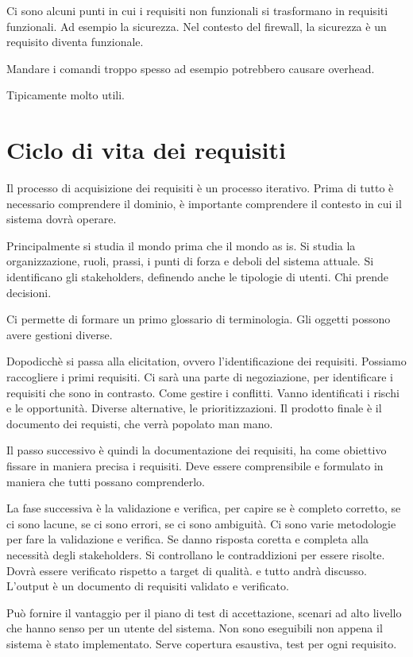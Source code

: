 \documentclass[oneside,a4paper,11pt]{book}
\theoremstyle{italicstyle}
\theoremstyle{normStyle}
\begin{document}
Ci sono alcuni punti in cui i requisiti non funzionali si 
trasformano in requisiti funzionali. Ad esempio la sicurezza.
Nel contesto del firewall, la sicurezza è un requisito diventa funzionale.

Mandare i comandi troppo spesso ad esempio potrebbero causare overhead.

Tipicamente molto utili.

\section{Ciclo di vita dei requisiti}
Il processo di acquisizione dei requisiti è un processo iterativo.
Prima di tutto è necessario comprendere il dominio, è importante 
comprendere il contesto in cui il sistema dovrà operare. 

Principalmente si studia il mondo prima che il mondo as is. Si studia la organizzazione,
ruoli, prassi, i punti di forza e deboli del sistema attuale. Si identificano 
gli stakeholders, definendo anche le tipologie di utenti. Chi prende decisioni.

Ci permette di formare un primo glossario di terminologia. Gli oggetti possono avere gestioni 
diverse.

Dopodicchè si passa alla elicitation, ovvero l'identificazione dei requisiti.
Possiamo raccogliere i primi requisiti. Ci sarà una parte di negoziazione, 
per identificare i requisiti che sono in contrasto. Come gestire i conflitti.
Vanno identificati i rischi e le opportunità. Diverse alternative, le prioritizzazioni.
Il prodotto finale è il documento dei requisti, che verrà popolato man mano.

Il passo successivo è quindi la documentazione dei requisiti,
ha come obiettivo fissare in maniera precisa i requisiti.
Deve essere comprensibile e formulato in maniera che tutti possano comprenderlo.

La fase successiva è la validazione e verifica, per capire se è completo corretto, 
se ci sono lacune, se ci sono errori, se ci sono ambiguità.
Ci sono varie metodologie per fare la validazione e verifica. Se danno risposta coretta 
e completa alla necessità degli stakeholders. Si controllano le contraddizioni per 
essere risolte. Dovrà essere verificato rispetto a target di qualità. e tutto andrà 
discusso.
L'output è un documento di requisiti validato e verificato.

Può fornire il vantaggio per il piano di test di accettazione, scenari ad alto 
livello che hanno senso per un utente del sistema. Non sono eseguibili non appena 
il sistema è stato implementato. Serve copertura esaustiva, test per ogni requisito.
\end{document}
